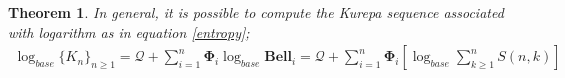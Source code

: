 \documentclass[pdflatex,sn-mathphys-num]{sn-jnl}%
\newtheorem{theorem}{Theorem}
\theoremstyle{thmstyleone}%
\theoremstyle{thmstyletwo}%
\theoremstyle{thmstylethree}%
\begin{document}


\begin{theorem}
    In general, it is possible to compute the Kurepa sequence associated with logarithm as in equation \ref{entropy};
    \begin{align}
          \log_{base} \lbrace K_n\rbrace_{n\geq 1}=\mathcal{Q}+\sum_{i=1}^{n}\mathbf{\Phi}_i \log_{base}\mathbf{Bell}_i=\mathcal{Q}+\sum_{i=1}^{n}\mathbf{\Phi}_i\left[ \log_{base} \sum_{k\geq 1}^{n} S(n,k)\right]
    \end{align}   
\end{theorem}
\end{document}
